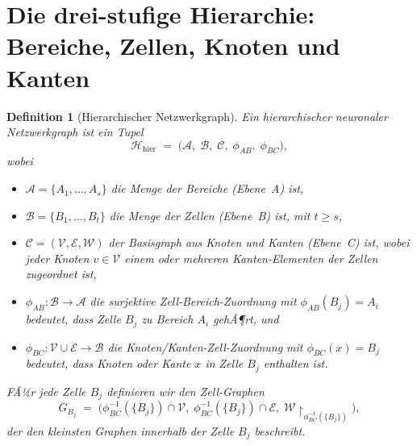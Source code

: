 ﻿\documentclass[12pt, a4paper, openany]{report}
\newtheorem{definition}[theorem]{Definition}
\newcommand{\calH}{\mathcal{H}}
\newcommand{\calV}{\mathcal{V}}
\newcommand{\calE}{\mathcal{E}}
\newcommand{\calW}{\mathcal{W}}
\newcommand{\calA}{\mathcal{A}}
\newcommand{\calB}{\mathcal{B}}
\newcommand{\calC}{\mathcal{C}}
\begin{document}
\section{Die drei-stufige Hierarchie: Bereiche, Zellen, Knoten und Kanten}
\label{sec:bio_hierarchy}

\begin{definition}[Hierarchischer Netzwerkgraph]
\label{def:hierarchical_graph}
Ein \emph{hierarchischer neuronaler Netzwerkgraph} ist ein Tupel
\[
  \calH_{\mathrm{hier}}
  \;=\;
  \bigl(\calA,\; \calB,\; \calC,\;
        \phi_{AB},\; \phi_{BC}\bigr),
\]
wobei
\begin{itemize}
  \item $\calA = \{A_1, \ldots, A_s\}$ die Menge der \emph{Bereiche}
    (Ebene~A) ist,
  \item $\calB = \{B_1, \ldots, B_t\}$ die Menge der \emph{Zellen}
    (Ebene~B) ist, mit $t \geq s$,
  \item $\calC = (\calV, \calE, \calW)$ der \emph{Basisgraph} aus Knoten
    und Kanten (Ebene~C) ist, wobei jeder Knoten $v \in \calV$ einem
    oder mehreren Kanten-Elementen der Zellen zugeordnet ist,
  \item $\phi_{AB} : \calB \to \calA$ die surjektive \emph{Zell-Bereich-Zuordnung}
    mit $\phi_{AB}(B_j) = A_i$ bedeutet, dass Zelle $B_j$ zu Bereich $A_i$
    gehÃ¶rt, und
  \item $\phi_{BC} : \calV \cup \calE \to \calB$ die \emph{Knoten/Kanten-Zell-Zuordnung}
    mit $\phi_{BC}(x) = B_j$ bedeutet, dass Knoten oder Kante $x$ in Zelle $B_j$
    enthalten ist.
\end{itemize}
FÃ¼r jede Zelle $B_j$ definieren wir den \emph{Zell-Graphen}
\[
  G_{B_j}
  \;=\;
  \bigl(
    \phi_{BC}^{-1}(\{B_j\}) \cap \calV,\;
    \phi_{BC}^{-1}(\{B_j\}) \cap \calE,\;
    \calW\!\restriction_{\phi_{BC}^{-1}(\{B_j\})}
  \bigr),
\]
der den \emph{kleinsten Graphen} innerhalb der Zelle $B_j$ beschreibt.
\end{definition}
\end{document}
